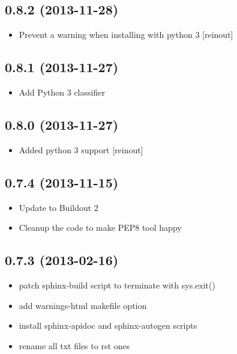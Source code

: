 \documentclass[letterpaper,10pt,english]{sphinxmanual}
\begin{document}
\subsection{0.8.2 (2013-11-28)}
\label{history:id1}\begin{itemize}
\item {} 
Prevent a warning when installing with python 3 {[}reinout{]}

\end{itemize}


\subsection{0.8.1 (2013-11-27)}
\label{history:id2}\begin{itemize}
\item {} 
Add Python 3 classifier

\end{itemize}


\subsection{0.8.0 (2013-11-27)}
\label{history:id3}\begin{itemize}
\item {} 
Added python 3 support {[}reinout{]}

\end{itemize}


\subsection{0.7.4 (2013-11-15)}
\label{history:id4}\begin{itemize}
\item {} 
Update to Buildout 2

\item {} 
Cleanup the code to make PEP8 tool happy

\end{itemize}


\subsection{0.7.3 (2013-02-16)}
\label{history:id5}\begin{itemize}
\item {} 
patch sphinx-build script to terminate with sys.exit()

\item {} 
add warnings-html makefile option

\item {} 
install sphinx-apidoc and sphinx-autogen scripts

\item {} 
rename all txt files to rst ones

\end{itemize}
\end{document}
